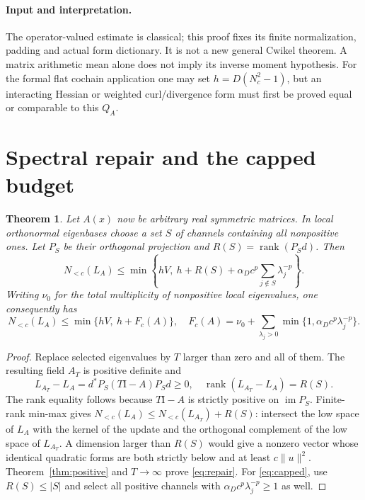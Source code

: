 \documentclass[11pt,a4paper]{article}
\newtheorem{theorem}{Theorem}
\newcommand{\rank}{\operatorname{rank}}
\newcommand{\im}{\operatorname{im}}
\newcommand{\id}{\mathrm I}
\newcommand{\Nlow}{N_{<c}}
\begin{document}
\paragraph{Input and interpretation.}
The operator-valued estimate is classical; this proof fixes its finite
normalization, padding and actual form dictionary. It is not a new general
Cwikel theorem. A matrix arithmetic mean alone does not imply its inverse
moment hypothesis. For the formal flat cochain application one may set
$h=D(N_c^2-1)$, but an interacting Hessian or weighted curl/divergence form
must first be proved equal or comparable to this $Q_A$.

\section{Spectral repair and the capped budget}
\begin{theorem}\label{thm:repair}
Let $A(x)$ now be arbitrary real symmetric matrices. In local orthonormal
eigenbases choose a set $S$ of channels containing all nonpositive ones.
Let $P_S$ be their orthogonal projection and $R(S)=\rank(P_Sd)$. Then
\begin{equation}\label{eq:repair}
 \Nlow(L_A)\leq\min\left\{hV,\ h+R(S)+
          \alpha_Dc^p\sum_{j\notin S}\lambda_j^{-p}\right\}.
\end{equation}
Writing $\nu_0$ for the total multiplicity of nonpositive local eigenvalues,
one consequently has
\begin{equation}\label{eq:capped}
 \Nlow(L_A)\leq\min\{hV,\ h+F_c(A)\},\quad
 F_c(A)=\nu_0+\sum_{\lambda_j>0}
                  \min\{1,\alpha_Dc^p\lambda_j^{-p}\}.
\end{equation}
\end{theorem}
\begin{proof}
Replace selected eigenvalues by $T$ larger than zero and all of them.
The resulting field $A_T$ is positive definite and
\[
 L_{A_T}-L_A=d^*P_S(T\id-A)P_Sd\geq0,
 \quad\rank(L_{A_T}-L_A)=R(S).
\]
The rank equality follows because $T\id-A$ is strictly positive on
$\im P_S$. Finite-rank min-max gives
$\Nlow(L_A)\leq\Nlow(L_{A_T})+R(S)$: intersect the low space of $L_A$
with the kernel of the update and the orthogonal complement of the low
space of $L_{A_T}$. A dimension larger than $R(S)$ would give a nonzero
vector whose identical quadratic forms are both strictly below and at least
$c\|u\|^2$. Theorem~\ref{thm:positive} and $T\to\infty$ prove
\eqref{eq:repair}. For \eqref{eq:capped}, use $R(S)\leq|S|$ and select
all positive channels with $\alpha_Dc^p\lambda_j^{-p}\geq1$ as well.
\end{proof}
\end{document}
